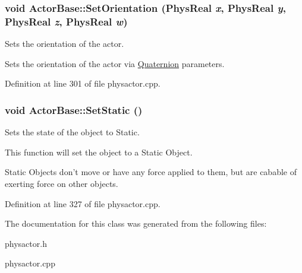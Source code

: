 \hypertarget{classActorBase_a9777506815a9840552b30c65d5d70f8d}{
\subsubsection[{SetOrientation}]{\setlength{\rightskip}{0pt plus 5cm}void ActorBase::SetOrientation (PhysReal {\em x}, \/  PhysReal {\em y}, \/  PhysReal {\em z}, \/  PhysReal {\em w})}}
\label{dd/d7b/classActorBase_a9777506815a9840552b30c65d5d70f8d}


Sets the orientation of the actor. 

Sets the orientation of the actor via \hyperlink{classQuaternion}{Quaternion} parameters. 

Definition at line 301 of file physactor.cpp.

\hypertarget{classActorBase_a97f55e5fff5d69483ebb0b9042a50bb0}{
\subsubsection[{SetStatic}]{\setlength{\rightskip}{0pt plus 5cm}void ActorBase::SetStatic ()}}
\label{dd/d7b/classActorBase_a97f55e5fff5d69483ebb0b9042a50bb0}


Sets the state of the object to Static. 

This function will set the object to a Static Object. \par
 Static Objects don't move or have any force applied to them, but are cabable of exerting force on other objects. 

Definition at line 327 of file physactor.cpp.



The documentation for this class was generated from the following files:\begin{DoxyCompactItemize}
\item 
physactor.h\item 
physactor.cpp\end{DoxyCompactItemize}
